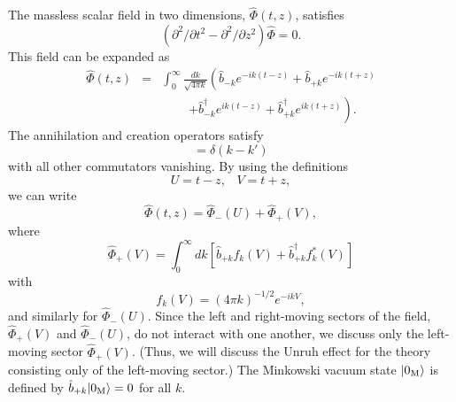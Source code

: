 \documentclass[12pt,nofootinbib,floatfix,aps,prd,showpacs,amsmath,amssymb,eqsecnum]{revtex4-2}
\begin{document}
The massless scalar field in two dimensions, 
$\hat{\Phi}(t,z)$, satisfies
\begin{equation}
     ( {\partial^2}/{\partial t^2}
        -
      {\partial^2}/{\partial z^2}) \hat{\Phi} 
= 0. 
\label{sec2:twodimMink}
\end{equation}
This field can be expanded as
\begin{eqnarray}
\hat{\Phi}(t,z) & = & \int_{0}^\infty \frac{dk}{\sqrt{4\pi k}} \left(
\hat{b}_{-k}e^{-ik(t-z)} + \hat{b}_{+k}e^{-ik(t+z)}\right.\nonumber \\
&& \ \ \ \ \ \ \ \ \ \ \left. + \hat{b}_{-k}^\dagger
e^{ik(t-z)} +
\hat{b}_{+k}^\dagger e^{ik(t+z)}\right).
\end{eqnarray}
The annihilation and creation operators satisfy
\begin{equation}
[ \hat{b}_{\pm k}, \hat{b}_{\pm k'}^\dagger ] = \delta(k-k')
\end{equation}
with all other commutators vanishing.
By using the definitions
\begin{equation}
U  =  t - z,\;\;\;
V  =  t + z,
\end{equation}
we can write
\begin{equation}
\hat{\Phi}(t,z) = \hat{\Phi}_{-}(U) + \hat{\Phi}_{+}(V),
\end{equation}
where
\begin{equation}
\hat{\Phi}_{+}(V) = \int_0^\infty dk \left[ \hat{b}_{+k}f_k(V) +
\hat{b}_{+k}^\dagger f_k^*(V)\right]
\end{equation}
with
\begin{equation}
f_k(V) = (4\pi k)^{-1/2}e^{-ikV},
\end{equation}
and similarly for $\hat{\Phi}_{-}(U)$. 
Since the left and right-moving sectors of the field, 
$\hat{\Phi}_{+}(V)$ and
$\hat{\Phi}_{-}(U)$, do not interact with one another,  
we discuss only the left-moving sector $\hat{\Phi}_{+}(V)$.  
(Thus, we will
discuss the Unruh effect for the theory consisting only of the
left-moving sector.) The Minkowski vacuum state $|0_{\rm M}\rangle$ is
defined by $\hat{b}_{+k}|0_{\rm M}\rangle = 0$ for all $k$.
\end{document}
